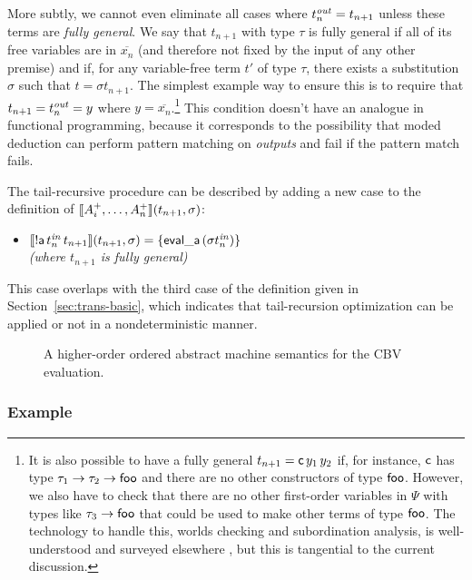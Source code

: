More subtly, we cannot even eliminate all cases where $t^{\it out}_n =
t_{n+1}$ unless these terms are {\it fully general}. We say that
$t_{n+1}$ with type $\tau$ is fully general if all of its free
variables are in $\overline{x_n}$ (and therefore not fixed by the
input of any other premise) and if, for any variable-free term $t'$ of
type $\tau$, there exists a substitution $\sigma$ such that $t =
{\sigma}t_{n+1}$. The simplest example way to ensure this is to require
that $t_{n+1} = t^{\it out}_n = y$ where $y =
\overline{x_n}$.\footnote{It is also possible to have a fully general
  $t_{n+1} = {\sf c}\,y_1\,y_2$ if, for instance, ${\sf c}$ has type
  $\tau_1 \rightarrow \tau_2 \rightarrow {\sf foo}$ and there are no
  other constructors of type ${\sf foo}$. However, we also have to
  check that there are no other first-order variables in $\Psi$ with
  types like $\tau_3 \rightarrow {\sf foo}$ that could be used to make
  other terms of type ${\sf foo}$. The technology to handle this,
  worlds checking and subordination analysis, is well-understood and
  surveyed elsewhere \cite{harper07mechanizing}, but this is
  tangential to the current discussion.} This condition doesn't have
an analogue in functional programming, because it corresponds to the
possibility that moded deduction can perform pattern
matching on {\it outputs} and fail if the pattern match fails.

The tail-recursive procedure can be described by adding a new 
case to the definition of 
$\llbracket {A^+_i,\ldots,A^+_n} \rrbracket({t_{n+1}},{\sigma})$:

\begin{itemize}
\item $\llbracket {{!}{\sf a}\,t^{\it in}_n\,t_{n+1}} \rrbracket({t_{n+1}},{\sigma}) 
  = \{{\sf eval\_a}\,({\sigma}{t^{\it in}_n})\}$
\\
  {\it (where $t_{n+1}$ is fully general)}
\end{itemize}
This case overlaps with the third case of the definition given
in Section~\ref{sec:trans-basic}, which indicates that tail-recursion
optimization can be applied or not in a nondeterministic manner.

\begin{figure}
\caption{A higher-order ordered abstract machine semantics for the CBV
  evaluation.}
\label{fig:cbv-ev-ssos-tail}
\end{figure}

\subsubsection{Example}


